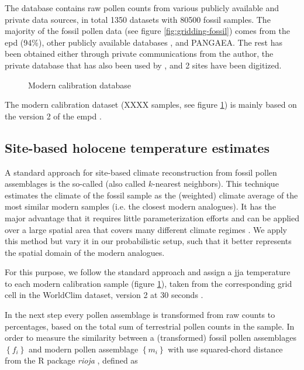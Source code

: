\begin{refsection}
The database contains raw pollen counts from various publicly available and private data sources, in total 1350 datasets with 80500 fossil samples. The majority of the fossil pollen data (see figure \ref{fig:gridding-fossil}) comes from the \gls{epd} (94\%), other publicly available databases , and PANGAEA. The  rest has been obtained either through private communications from the author, the private database that has also been used by \cite{MauriDavisCollinsEtAl2015}, and 2 sites have been digitized.

\begin{figure}
	\caption{Modern calibration database}
	\label{fig:gridding-modern}
\end{figure}

The modern calibration dataset (XXXX samples, see figure \ref{fig:gridding-modern}) is mainly based on the version 2 of the \gls{empd} \citep{DavisZanonCollinsEtAl2013}. 


\subsection{Site-based holocene temperature estimates}  \label{sec:gridding-mat}
A standard approach for site-based climate reconstruction from fossil pollen assemblages is the so-called  (also called $k$-nearest neighbors). This technique estimates the climate of the fossil sample as the (weighted) climate average of the most similar modern samples (i.e. the closest modern analogues). It has the major advantage that it requires little parameterization efforts and can be applied over a large spatial area that covers many different climate regimes \citep{MauriDavisCollinsEtAl2015}. We apply this method but vary it in our probabilistic setup, such that it better represents the spatial domain of the modern analogues.

For this purpose, we follow the standard approach and assign a \gls{jja} temperature to each modern calibration sample (figure \ref{fig:gridding-modern}), taken from the corresponding grid cell in the WorldClim dataset, version 2 at 30 seconds \citep{FickHijmans2017}.

In the next step every pollen assemblage is transformed from raw counts to percentages, based on the total sum of terrestrial pollen counts in the sample. In order to measure the similarity between a (transformed) fossil pollen assemblages $\left\lbrace f_{i}\right\rbrace$ and modern pollen assemblage $\left\lbrace m_{i}\right\rbrace$ with use squared-chord distance from the R package \textit{rioja} \citep{Juggins2017}, defined as


\end{refsection}

